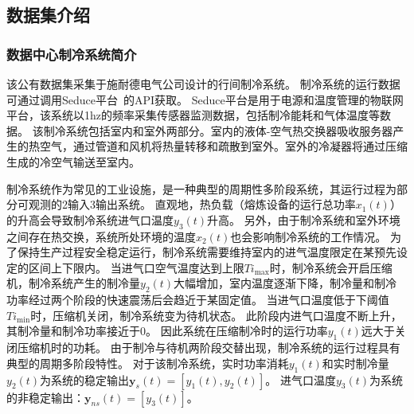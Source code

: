 \subsection{数据集介绍}
\subsubsection{数据中心制冷系统简介}
\label{sec:ecotype_description}
该公有数据集采集于施耐德电气公司设计的行间制冷系统\cite{WANG2022111790}。
制冷系统的运行数据可通过调用Seduce平台~\cite{SeducePastor2018}的API获取。
Seduce平台是用于电源和温度管理的物联网平台，该系统以1hz的频率采集传感器监测数据，包括制冷能耗和气体温度等数据。
该制冷系统包括室内和室外两部分。室内的液体-空气热交换器吸收服务器产生的热空气，通过管道和风机将热量转移和疏散到室外。室外的冷凝器将通过压缩生成的冷空气输送至室内。

制冷系统作为常见的工业设施，是一种典型的周期性多阶段系统，其运行过程为部分可观测的2输入3输出系统。
直观地，热负载（熔炼设备的运行总功率$x_1(t)$）的升高会导致制冷系统进气口温度$y_3(t)$升高。
另外，由于制冷系统和室外环境之间存在热交换，系统所处环境的温度$x_2(t)$也会影响制冷系统的工作情况。
为了保持生产过程安全稳定运行，制冷系统需要维持室内的进气温度限定在某预先设定的区间上下限内。
当进气口空气温度达到上限$Ti_{\max}$时，制冷系统会开启压缩机，制冷系统产生的制冷量$y_2(t)$大幅增加，室内温度逐渐下降，制冷量和制冷功率经过两个阶段的快速震荡后会趋近于某固定值。
当进气口温度低于下阈值$Ti_{\min}$时，压缩机关闭，制冷系统变为待机状态。
此阶段内进气口温度不断上升，其制冷量和制冷功率接近于0。
因此系统在压缩制冷时的运行功率$y_1(t)$远大于关闭压缩机时的功耗。
由于制冷与待机两阶段交替出现，制冷系统的运行过程具有典型的周期多阶段特性。
对于该制冷系统，实时功率消耗$y_1(t)$和实时制冷量$y_2(t)$为系统的稳定输出$\boldsymbol y_s(t)=[y_1(t), y_2(t)]$。
进气口温度$y_3(t)$为系统的非稳定输出：$\boldsymbol y_{ns}(t)=[y_3(t)]$。

